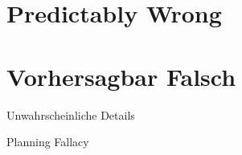 \ifEnglish

\section{Predictably Wrong}





\else


\section{Vorhersagbar Falsch}


\begin{frame}[c]{Unwahrscheinliche Details}

\end{frame}



\begin{frame}[c]{Planning Fallacy}

\end{frame}



\fi
